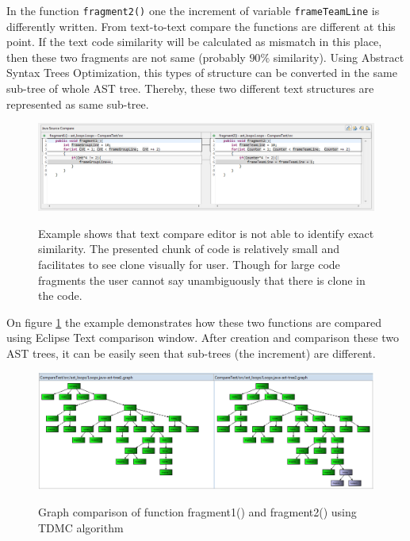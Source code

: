 \documentclass{report}
\begin{document}
In the function \texttt{fragment2()} one the increment of variable \texttt{frameTeamLine} is differently written. From text-to-text compare the functions are different at this point. If the text code similarity will be calculated as mismatch in this place, then these two fragments are not same (probably $90\%$ similarity). Using Abstract Syntax Trees Optimization, this types of structure can be converted in the same sub-tree of whole AST tree. Thereby, these two different text structures are represented as same sub-tree. 

\vspace{4mm}

\begin{figure}[h]
  \centering
  \includegraphics[width=1.00\textwidth]{Figures/AST-optimization/text-to-text-compare.png}\\[0.1cm]
  \caption[Example shows that text compare is not able to identify similarity]{Example shows that text compare editor is not able to identify exact similarity. The presented chunk of code is relatively small and facilitates to see clone visually for user. Though for large code fragments the user cannot say unambiguously that there is clone in the code. }
  \label{fig:text-to-text-compare}
\end{figure}

On figure \ref{fig:text-to-text-compare} the example demonstrates how these two functions are compared using Eclipse Text comparison window. After creation and comparison these two AST trees, it can be easily seen that sub-trees (the increment) are different.

\begin{figure}[h]
  \centering
  \includegraphics[width=1.00\textwidth]{Figures/AST-optimization/tree-compared1}\\[0.1cm]
  \caption[Graph comparison on similar AST trees using TDMC algorithm]{Graph comparison of function fragment1() and fragment2() using TDMC algorithm}
  \label{fig:ast-graph-compare-similar-tdmc}
\end{figure}
\end{document}
